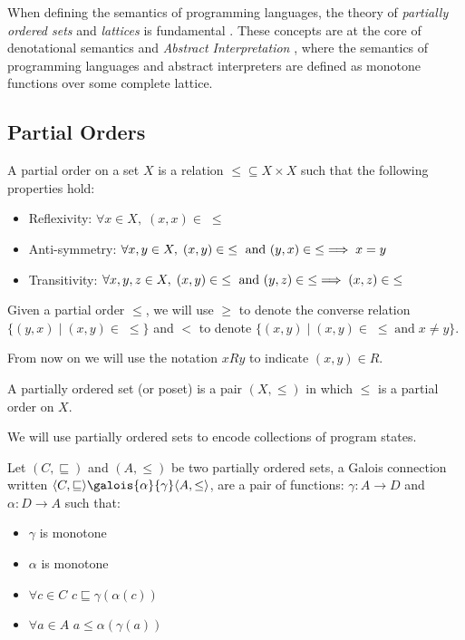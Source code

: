 \documentclass[
  10pt,       %
  twoside,    %
  a4paper,    %
  english,    %
  tikz,       %
  openright,  %
]{book}
\begin{document}
When defining the semantics of programming languages, the theory of 
\textit{partially ordered sets} and \textit{lattices} is fundamental
\cite{Gratzer11, Birkhoff40}. These 
concepts are at the core of denotational semantics \cite{Scott70} and 
\textit{Abstract Interpretation} \cite{Cousot77}, where the semantics of 
programming languages and abstract interpreters are defined as monotone 
functions over some complete lattice.

\subsection{Partial Orders}

\begin{definition}
  A partial order on a set $X$ is a relation $\leq \subseteq X \times X$ 
  such that the following properties hold:
  \begin{itemize}
    \item Reflexivity: $\forall x \in X, \; (x, x) \in \; \leq$
    \item Anti-symmetry: $\forall x, y \in X, \; (x, y) \in \; \leq \text{ and }
      (y, x) \in \; \leq \implies x = y$
    \item Transitivity: $\forall x, y, z \in X, \; (x, y) \in \; \leq \text{ and } 
      (y, z) \in \; \leq \implies (x, z) \in \;\leq$
  \end{itemize}
    
\end{definition}

Given a partial order $\leq$, we will use $\geq$ to denote the converse 
relation $\{ (y, x) \mid (x, y) \in \;\leq \}$ and $<$ to denote 
$\{ (x, y) \mid (x, y) \in \;\leq \; \text{and} \; x \neq y \}$.

From now on we will use the notation $x R y$ to indicate $(x, y) \in R$.

\begin{definition}
  A partially ordered set (or poset) is a pair $(X, \leq)$ in which $\leq$ is a 
  partial order on $X$.
\end{definition}

We will use partially ordered sets to encode collections of program states.

\begin{definition}
  Let $(C, \sqsubseteq)$ and $(A, \leq)$ be two partially ordered sets, a 
  Galois connection written $\langle C, \sqsubseteq \rangle 
  \galois{\alpha}{\gamma} \langle A, \leq \rangle$, are a pair of functions:
  $\gamma : A \to D$ and $\alpha : D \to A$ such that:
  \begin{itemize}
    \item $\gamma$ is monotone
    \item $\alpha$ is monotone
    \item $\forall c \in C$ $c \sqsubseteq \gamma(\alpha(c))$
    \item $\forall a \in A$ $a \leq \alpha(\gamma(a))$
  \end{itemize}
\end{definition}
\end{document}
